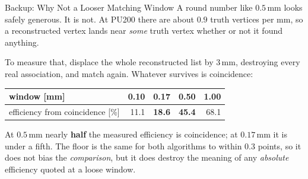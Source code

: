 \documentclass[xcolor=table,aspectratio=169]{beamer}
\begin{document}
\begin{frame}{Backup: Why Not a Looser Matching Window}
    \vfill
    \small
    A round number like $0.5$\,mm looks safely generous. It is not. At PU200 there are
    about $0.9$ truth vertices per mm, so a reconstructed vertex lands near \emph{some}
    truth vertex whether or not it found anything.
    \vspace{0.6em}

    \centering
    To measure that, displace the whole reconstructed list by $3$\,mm, destroying every
    real association, and match again. Whatever survives is coincidence:
    \vspace{0.6em}

    \footnotesize
    \setlength{\tabcolsep}{9pt}
    \begin{tabular}{l rrrr}
        \toprule
        window \textcolor{black!55}{[mm]} & 0.10 & \textbf{0.17} & 0.50 & 1.00 \\
        \midrule
        efficiency from coincidence \textcolor{black!55}{[\%]}
            & 11.1 & \textbf{18.6} & \textcolor{pennred}{\textbf{45.4}} & 68.1 \\
        \bottomrule
    \end{tabular}

    \vspace{0.8em}
    \raggedright\small
    At $0.5$\,mm nearly \textbf{half} the measured efficiency is coincidence; at
    $0.17$\,mm it is under a fifth. The floor is the same for both algorithms to within
    $0.3$ points, so it does not bias the \emph{comparison}, but it does destroy the
    meaning of any \emph{absolute} efficiency quoted at a loose window.
\end{frame}
\end{document}
